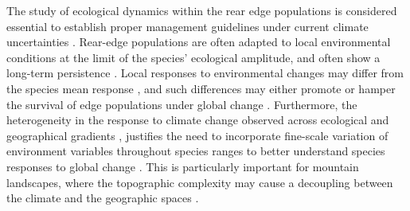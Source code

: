 The study of ecological dynamics within the rear edge populations is considered essential to establish proper management guidelines under current climate uncertainties \autocite{Fadyetal2016EvolutionbasedApproach}. Rear-edge populations are often adapted to local environmental conditions at the limit of the species' ecological amplitude, and often show a long-term persistence \autocite{HampePetit2005ConservingBiodiversity}. Local responses to environmental changes may differ from the species mean response \autocite{Castroetal2004SeedlingEstablishment,Benavidesetal2013DirectIndirect,GeaIzquierdoCanellas2014LocalClimate,Matiasetal2017ContrastingGrowth}, and such differences may either promote or hamper the survival of edge populations under global change \autocite{BenitoGarzonetal2011IntraspecificVariability}. Furthermore, the heterogeneity in the response to climate change observed across ecological and geographical gradients \autocite{GeaIzquierdoetal2013GrowthProjections,Chenetal2015InfluenceClimate,DoradoLinanetal2019GeographicalAdaptation,PerezLuqueetal2020LanduseLegacies}, justifies the need to incorporate fine-scale variation of environment variables throughout species ranges to better understand species responses to global change \autocite{DeFrenneetal2013MicroclimateModerates,Oldfatheretal2020RangeEdges}. This is particularly important for mountain landscapes, where the topographic complexity may cause a decoupling between the climate and the geographic spaces \autocite{ElsenTingley2015GlobalMountain,Pirononetal2015GeographicClimatic}.


